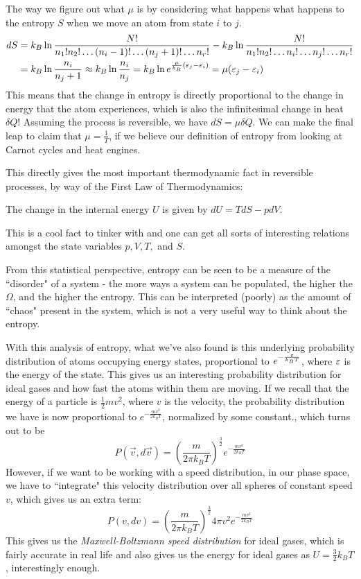 The way we figure out what $\mu$ is by considering what happens what happens to the entropy $S$ when we move an atom from state $i$ to $j$. 
\begin{align*}
	dS &= k_B \ln \frac{N!}{n_1! n_2! \ldots (n_i-1)! \ldots (n_j+1)! \ldots n_r!} - k_B \ln \frac{N!}{n_1! n_2! \ldots n_i! \ldots n_j! \ldots n_r!} \\
	&= k_B \ln \frac{n_i}{n_j +1} \approx k_B \ln \frac{n_i}{n_j} = k_B \ln e^{\frac{\mu}{k_B}(\varepsilon_j - \varepsilon_i)} = \mu (\varepsilon_j - \varepsilon_i)
\end{align*}
This means that the change in entropy is directly proportional to the change in energy that the atom experiences, which is also the infinitesimal change in heat $\delta Q$! Assuming the process is reversible, we have $dS = \mu \delta Q$. We can make the final leap to claim that $\mu = \frac{1}{T}$, if we believe our definition of entropy from looking at Carnot cycles and heat engines.

This directly gives the most important thermodynamic fact in reversible processes, by way of the First Law of Thermodynamics: 
\begin{theorem}
The change in the internal energy $U$ is given by $dU = T dS - p dV$.
\label{thm-first}
\end{theorem}
This is a cool fact to tinker with and one can get all sorts of interesting relations amongst the state variables $p, V, T,$ and $S$. 

From this statistical perspective, entropy can be seen to be a measure of the ``disorder" of a system - the more ways a system can be populated, the higher the $\Omega$, and the higher the entropy. This can be interpreted (poorly) as the amount of ``chaos" present in the system, which is not a very useful way to think about the entropy. 

With this analysis of entropy, what we've also found is this underlying probability distribution of atoms occupying energy states, proportional to $e^{-\frac{\varepsilon}{k_B T}}$, where $\varepsilon$ is the energy of the state. This gives us an interesting probability distribution for ideal gases and how fast the atoms within them are moving. If we recall that the energy of a particle is $\frac{1}{2} mv^2$, where $v$ is the velocity, the probability distribution we have is now proportional to $e^{-\frac{mv^2}{2 k_B T}}$, normalized by some constant., which turns out to be
\[
    P(\vec v, d\vec v) = \left(\frac{m}{2\pi k_B T} \right)^{\frac{3}{2}} e^{-\frac{mv^2}{2 k_B T}}
\]
However, if we want to be working with a speed distribution, in our phase space, we have to ``integrate" this velocity distribution over all spheres of constant speed $v$, which gives us an extra term: 
\[
    P(v, dv) = \left(\frac{m}{2\pi k_B T} \right)^{\frac{3}{2}} 4\pi v^2 e^{-\frac{mv^2}{2 k_B T}}
\]
This gives us the \textit{Maxwell-Boltzmann speed distribution} for ideal gases, which is fairly accurate in real life and also gives us the energy for ideal gases as $U = \frac{3}{2} k_B T$, interestingly enough.

